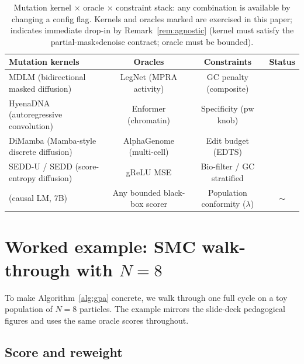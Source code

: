 \begin{table}[h]
\caption{Mutation kernel $\times$ oracle $\times$ constraint stack: any combination is available by changing a config flag. Kernels and oracles marked \cmark{} are exercised in this paper; \pmark{} indicates immediate drop-in by Remark~\ref{rem:agnostic} (kernel must satisfy the partial-mask$\circ$denoise contract; oracle must be bounded).}
\label{tab:gpa_matrix}
\centering
\small
\newcommand{\cmark}{\textcolor{green!55!black}{\ding{51}}}
\newcommand{\pmark}{\textcolor{orange!80!black}{$\sim$}}
\begin{tabular}{lccc}
\toprule
\textbf{Mutation kernels} & \textbf{Oracles} & \textbf{Constraints} & \textbf{Status} \\
\midrule
MDLM (bidirectional masked diffusion)   & LegNet (MPRA activity)        & GC penalty (composite)             & \cmark \\
HyenaDNA (autoregressive convolution)   & Enformer (chromatin)          & Specificity ($\mathrm{pw}$ knob)   & \cmark \\
DiMamba (Mamba-style discrete diffusion)& AlphaGenome (multi-cell)      & Edit budget (EDTS)                 & \cmark \\
SEDD-U / SEDD (score-entropy diffusion) & gReLU MSE                     & Bio-filter / GC stratified         & \cmark \\
\evo{} (causal LM, 7B)                  & Any bounded black-box scorer  & Population conformity ($\lambda$)  & \pmark \\
\bottomrule
\end{tabular}
\end{table}

\section{Worked example: SMC walk-through with $N=8$}\label{app:walkthrough}

To make Algorithm~\ref{alg:gpa} concrete, we walk through one full \gpa{} cycle on a toy population of $N\!=\!8$ particles. The example mirrors the slide-deck pedagogical figures and uses the same oracle scores throughout.

\subsection{Score and reweight}

